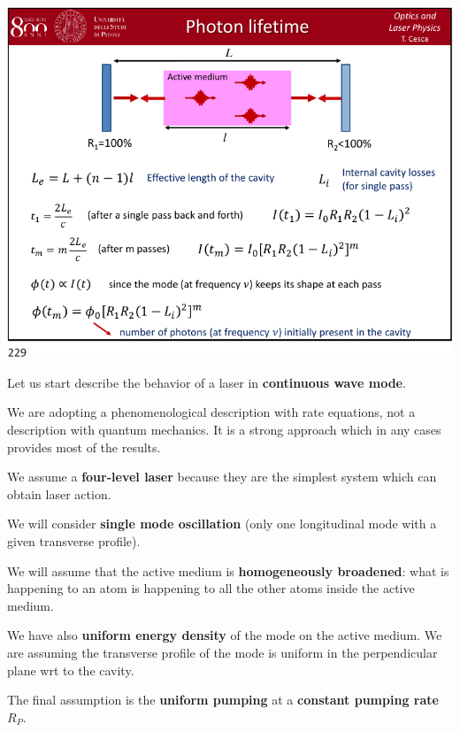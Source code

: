 \documentclass[../main/main.tex]{subfiles}
\begin{document}
\begin{minipage}[]{0.5\linewidth}
\centering
\includegraphics[page=8,width=1\textwidth]{../lessons/pdf_file/12_lecture.pdf}
\end{minipage}
\hspace{0.3cm}\vspace{0.3cm}
\begin{minipage}[c]{0.47\linewidth}

Let us start describe the behavior of a laser in \textbf{continuous wave mode}.

We are adopting a phenomenological description with rate equations, not a description with quantum mechanics. It is a strong approach which in any cases provides most of the results.

We assume a \textbf{four-level laser} because they are the simplest system which can obtain laser action.

We will consider \textbf{single mode oscillation} (only one longitudinal mode with a given transverse profile).

We will assume that the active medium is \textbf{homogeneously broadened}: what is happening to an atom is happening to all the other atoms inside the active medium.

\end{minipage}

We have also \textbf{uniform energy density} of the mode on the active medium.
We are assuming the transverse profile of the mode is uniform in the perpendicular plane wrt to the cavity.

The final assumption is the \textbf{uniform pumping} at a \textbf{constant pumping rate} \( R_P \).
\end{document}
